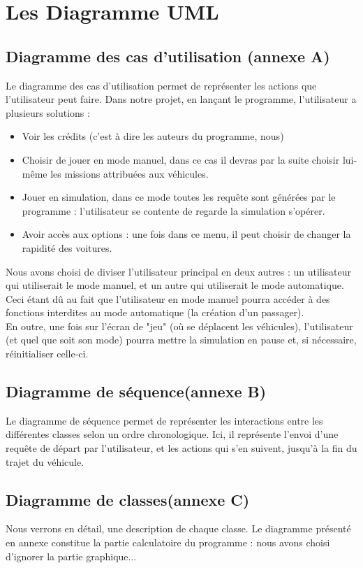 \documentclass[a4paper, titlepage]{report}
\begin{document}
\chapter{Les Diagramme UML}
\section{Diagramme des cas d'utilisation (annexe A)}
\hspace{0.5cm} Le diagramme des cas d'utilisation permet de représenter les actions que l'utilisateur peut faire. Dans notre projet, en lançant le programme, l'utilisateur a plusieurs solutions :
\begin{itemize}
\item Voir les crédits (c'est à dire les auteurs du programme, nous)
\item Choisir de jouer en mode manuel, dans ce cas il devras par la suite choisir lui-même les missions attribuées aux véhicules.
\item Jouer en simulation, dans ce mode toutes les requête sont générées par le programme : l'utilisateur se contente de regarde la simulation s'opérer.
\item Avoir accès aux options : une fois dans ce menu, il peut choisir de changer la rapidité des voitures.
\end{itemize}
Nous avons choisi de diviser l'utilisateur principal en deux autres : un utilisateur qui utiliserait le mode manuel, et un autre qui utiliserait le mode automatique. Ceci étant dû au fait que l'utilisateur en mode manuel pourra accéder à des fonctions interdites au mode automatique (la création d'un passager).\\
En outre, une fois sur l'écran de "jeu" (où se déplacent les véhicules), l'utilisateur (et quel que soit son mode) pourra mettre la simulation en pause et, si nécessaire, réinitialiser celle-ci. 
\section{Diagramme de séquence(annexe B)}
\hspace{0.5cm} Le diagramme de séquence permet de représenter les interactions entre les différentes classes selon un ordre chronologique. Ici, il représente l'envoi d'une requête de départ par l'utilisateur, et les actions qui s'en suivent, jusqu'à la fin du trajet du véhicule.
\section{Diagramme de classes(annexe C)}
\hspace{0.5cm} Nous verrons en détail, une description de chaque classe. Le diagramme présenté en annexe constitue la partie calculatoire du programme : nous avons choisi d'ignorer la partie graphique...
\end{document}
